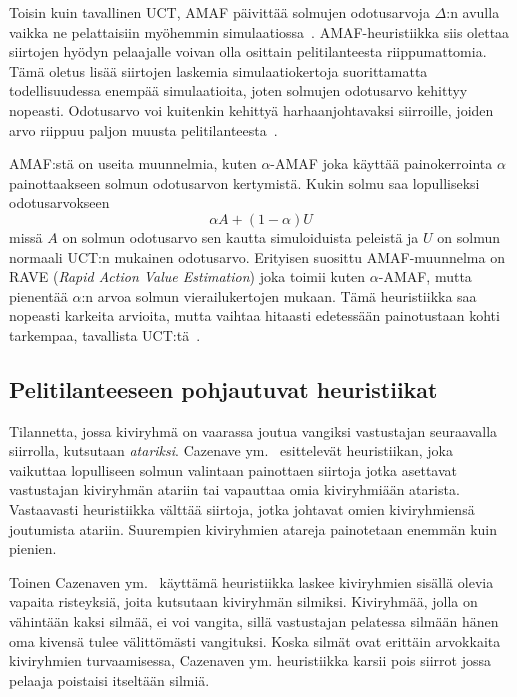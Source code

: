 \documentclass[12pt,finnish]{tktltiki2}
\theoremstyle{definition}
\theoremstyle{remark}
\begin{document}
Toisin kuin tavallinen UCT, AMAF päivittää solmujen odotusarvoja $\Delta$:n avulla vaikka ne pelattaisiin myöhemmin simulaatiossa~\cite{browne, helmbold}. AMAF-heuristiikka siis olettaa siirtojen hyödyn pelaajalle voivan olla osittain pelitilanteesta riippumattomia. Tämä oletus lisää siirtojen laskemia simulaatiokertoja suorittamatta todellisuudessa enempää simulaatioita, joten solmujen odotusarvo kehittyy nopeasti. Odotusarvo voi kuitenkin kehittyä harhaanjohtavaksi siirroille, joiden arvo riippuu paljon muusta pelitilanteesta~\cite{helmbold}.

AMAF:stä on useita muunnelmia, kuten $\alpha$-AMAF joka käyttää painokerrointa $\alpha$ painottaakseen solmun odotusarvon kertymistä. Kukin solmu saa lopulliseksi odotusarvokseen
\begin{equation}
\alpha A + (1 - \alpha)U
\end{equation}
missä $A$ on solmun odotusarvo sen kautta simuloiduista peleistä ja $U$ on solmun normaali UCT:n mukainen odotusarvo. Erityisen suosittu AMAF-muunnelma on RAVE (\textit{Rapid Action Value Estimation}) joka toimii kuten $\alpha$-AMAF, mutta pienentää $\alpha$:n arvoa solmun vierailukertojen mukaan. Tämä heuristiikka saa nopeasti karkeita arvioita, mutta vaihtaa hitaasti edetessään painotustaan kohti tarkempaa, tavallista UCT:tä~\cite{browne}.

\subsection{Pelitilanteeseen pohjautuvat heuristiikat}

Tilannetta, jossa kiviryhmä on vaarassa joutua vangiksi vastustajan seuraavalla siirrolla, kutsutaan \textit{atariksi}. Cazenave ym.~\cite{cazenaveatari} esittelevät heuristiikan, joka vaikuttaa lopulliseen solmun valintaan painottaen siirtoja jotka asettavat vastustajan kiviryhmän atariin tai vapauttaa omia kiviryhmiään atarista. Vastaavasti heuristiikka välttää siirtoja, jotka johtavat omien kiviryhmiensä joutumista atariin. Suurempien kiviryhmien atareja painotetaan enemmän kuin pienien.

Toinen Cazenaven ym.~\cite{cazenave} käyttämä heuristiikka laskee kiviryhmien sisällä olevia vapaita risteyksiä, joita kutsutaan kiviryhmän silmiksi. Kiviryhmää, jolla on vähintään kaksi silmää, ei voi vangita, sillä vastustajan pelatessa silmään hänen oma kivensä tulee välittömästi vangituksi. Koska silmät ovat erittäin arvokkaita kiviryhmien turvaamisessa, Cazenaven ym. heuristiikka karsii pois siirrot jossa pelaaja poistaisi itseltään silmiä.
\end{document}
